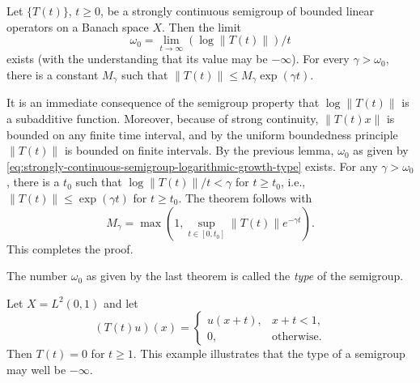 \begin{Theorem}
\label{thm:semigroup-logarithmic-growth-type}
Let $\{T(t)\}$, $t\geq0$, be a strongly continuous semigroup of bounded linear operators on a Banach space $X$. Then the limit
\begin{equation}\label{eq:strongly-continuous-semigroup-logarithmic-growth-type}
\omega_0=\lim_{t\to\infty}(\log\|T(t)\|)/t
\end{equation}
exists (with the understanding that its value may be $-\infty$). For every $\gamma>\omega_0$, there is a constant $M_\gamma$ such that $\|T(t)\|\leq M_\gamma\exp(\gamma t)$.
\end{Theorem}

\begin{Proof}
It is an immediate consequence of the semigroup property that $\log\|T(t)\|$ is a subadditive function. Moreover, because of strong continuity, $\|T(t)x\|$ is bounded on any finite time interval, and by the uniform boundedness principle $\|T(t)\|$ is bounded on finite intervals. By the previous lemma, $\omega_0$ as given by \eqref{eq:strongly-continuous-semigroup-logarithmic-growth-type} exists. For any $\gamma>\omega_0$, there is a $t_0$ such that $\log\|T(t)\|/t<\gamma$ for $t\geq t_0$, i.e., $\|T(t)\|\leq\exp(\gamma t)$ for $t\geq t_0$. The theorem follows with
\begin{equation}\label{eq:semigroup-exponential-growth-bound-constant}
M_\gamma=\max\left(1,\sup_{t\in[0,t_0]}\|T(t)\|e^{-\gamma t}\right).
\end{equation}
This completes the proof.
\end{Proof}

\begin{Definition}
\label{def:semigroup-type}
The number $\omega_0$ as given by the last theorem is called the \emph{type} of the semigroup.
\end{Definition}

\begin{Example}
\label{ex:absorbing-translation-minus-infinite-type}
Let $X=L^2(0,1)$ and let
\begin{equation}\label{eq:finite-interval-absorbing-translation-semigroup}
(T(t)u)(x)=\begin{cases}u(x+t),&x+t<1,\\0,&\text{otherwise}.\end{cases}
\end{equation}
Then $T(t)=0$ for $t\geq1$. This example illustrates that the type of a semigroup may well be $-\infty$.
\end{Example}

